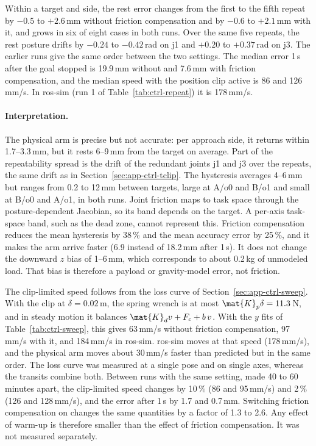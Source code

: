 Within a target and side, the rest error changes from the first to the fifth repeat by $-0.5$ to $+2.6$\,mm without friction compensation and by $-0.6$ to $+2.1$\,mm with it, and grows in six of eight cases in both runs. Over the same five repeats, the rest posture drifts by $-0.24$ to $-0.42$\,rad on j1 and $+0.20$ to $+0.37$\,rad on j3. The earlier runs give the same order between the two settings. The median error 1\,s after the goal stopped is 19.9\,mm without and 7.6\,mm with friction compensation, and the median speed with the position clip active is 86 and 126\,mm/s. In ros-sim (run 1 of Table~\ref{tab:ctrl-repeat}) it is 178\,mm/s.

\paragraph{Interpretation.} The physical arm is precise but not accurate: per approach side, it returns within 1.7--3.3\,mm, but it rests 6--9\,mm from the target on average. Part of the repeatability spread is the drift of the redundant joints j1 and j3 over the repeats, the same drift as in Section~\ref{sec:app-ctrl-tclip}. The hysteresis averages 4--6\,mm but ranges from 0.2 to 12\,mm between targets, large at A/o0 and B/o1 and small at B/o0 and A/o1, in both runs. Joint friction maps to task space through the posture-dependent Jacobian, so its band depends on the target. A per-axis task-space band, such as the dead zone, cannot represent this. Friction compensation reduces the mean hysteresis by 38\,\% and the mean accuracy error by 25\,\%, and it makes the arm arrive faster (6.9 instead of 18.2\,mm after 1\,s). It does not change the downward $z$ bias of 1--6\,mm, which corresponds to about 0.2\,kg of unmodeled load. That bias is therefore a payload or gravity-model error, not friction.

The clip-limited speed follows from the loss curve of Section~\ref{sec:app-ctrl-sweep}. With the clip at $\delta=0.02$\,m, the spring wrench is at most $\mat{K}_p\delta=11.3$\,N, and in steady motion it balances $\mat{K}_d v+F_c+b\,v$. With the $y$ fits of Table~\ref{tab:ctrl-sweep}, this gives 63\,mm/s without friction compensation, 97\,mm/s with it, and 184\,mm/s in ros-sim. ros-sim moves at that speed (178\,mm/s), and the physical arm moves about 30\,mm/s faster than predicted but in the same order. The loss curve was measured at a single pose and on single axes, whereas the transits combine both. Between runs with the same setting, made 40 to 60 minutes apart, the clip-limited speed changes by 10\,\% (86 and 95\,mm/s) and 2\,\% (126 and 128\,mm/s), and the error after 1\,s by 1.7 and 0.7\,mm. Switching friction compensation on changes the same quantities by a factor of 1.3 to 2.6. Any effect of warm-up is therefore smaller than the effect of friction compensation. It was not measured separately.

